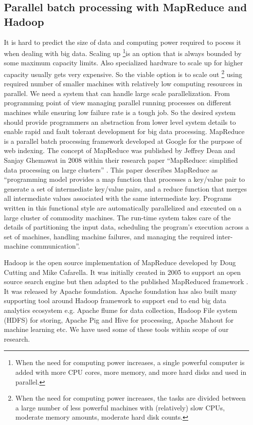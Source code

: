 \subsection{Parallel batch processing with MapReduce and Hadoop} 
It is hard to predict the size of data and computing power required to pocess it when dealing with big data. Scaling up \footnote{When the need for computing power increases, a single powerful computer is added with more CPU cores, more memory, and more hard disks and used in parallel.}is an option that is always bounded by some maximum capacity limits. Also specialized hardware to scale up for higher capacity usually gets very expensive. So the viable option is to scale out \footnote{When the need for computing power increases, the tasks are divided between a large number of less powerful machines with (relatively) slow CPUs, moderate memory amounts, moderate hard disk counts.} using required number of smaller machines with relatively low computing resources in parallel. We need a system that can handle large scale parallelization. From programming point of view managing parallel running processes on different machines while ensuring low failure rate is a tough job. So the desired system should provide programmers an abstraction from lower level system details to enable rapid and fault tolerant development for big data processing.  MapReduce is a parallel batch processing framework developed at Google for the purpose of web indexing. The concept of MapReduce was published by Jeffrey Dean and Sanjay Ghemawat in 2008 within their research paper ``MapReduce: simplified data processing on large clusters''  \cite{dean2008mapreduce}. This paper describes MapReduce as ``programming model provides a map function that processes a key/value pair to generate a set of intermediate key/value pairs, and a reduce function that merges all intermediate values associated with the same intermediate key. Programs written in this functional style are automatically parallelized and executed on a large cluster of commodity machines. The run-time system takes care of the details of partitioning the input data, scheduling the program's execution across a set of machines, handling machine failures, and managing the required inter-machine communication''.

Hadoop is the open source implementation of MapReduce developed by Doug Cutting and Mike Cafarella. It was initially created in 2005 to support an open source search engine but then adapted to the published MapReduced framework \cite{dean2008mapreduce}. It was released by Apache foundation. Apache foundation has also built many supporting tool around Hadoop framework to support end to end big data analytics ecosystem e.g. Apache flume for data collection, Hadoop File system (HDFS) for storing, Apache Pig and Hive for processing, Apache Mahout for machine learning etc. We have used some of these tools within scope of our research. 

